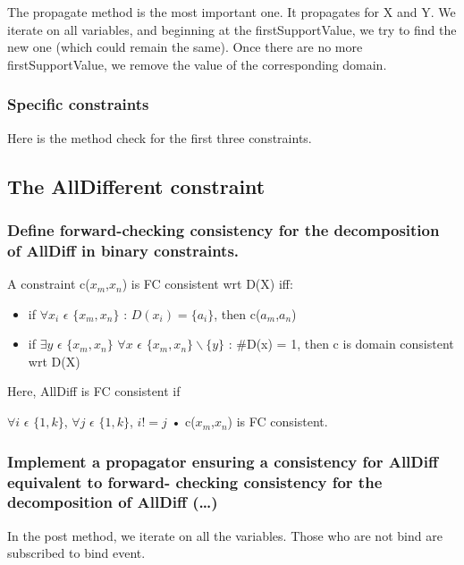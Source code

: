 \documentclass[a4paper ,12pt,french]{article}
\begin{document}
The propagate method is the most important one. It propagates for X and Y. We iterate on all variables, and beginning at the firstSupportValue, we try to find the new one (which could remain the same). Once there are no more firstSupportValue, we remove the value of the corresponding domain.


\subsubsection{Specific constraints}
Here is the method check for the first three constraints.


\subsection{The AllDifferent constraint}
\subsubsection{Define forward-checking consistency for the decomposition of AllDiff in binary constraints.}

A constraint c($x_m$,$x_n$) is FC consistent wrt D(X) iff:
\begin{itemize}
\item if $\forall x_i$ $\epsilon$ $\{x_m,x_n\}$ : $D(x_i) = \{a_i\}$, then c($a_m$,$a_n$) 
\item if $\exists y$ $\epsilon$ $\{x_m,x_n\}$ $\forall x$ $\epsilon$ $\{x_m,x_n\}\backslash\{y\}$ : \#D(x) = 1, then c is domain consistent wrt D(X)\\
\end{itemize}

Here, AllDiff is FC consistent if
\begin{center}
$\forall i$ $\epsilon$ $\{1,k\}$, $\forall j$ $\epsilon$ $\{1,k\}$, $i!=j$ • c($x_m$,$x_n$) is FC consistent.
\end{center}

\subsubsection{Implement a propagator ensuring a consistency for AllDiff equivalent to forward- checking consistency for the decomposition of AllDiff (\dots)}
In the post method, we iterate on all the variables. Those who are not bind are subscribed to bind event.

\end{document}
